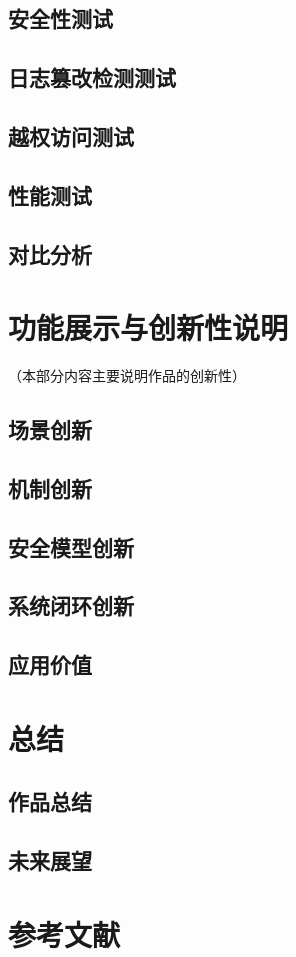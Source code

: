 \documentclass[UTF8,a4paper,zihao=-4,fontset=fandol]{ctexart}
\begin{document}
\subsection{安全性测试}

\subsection{日志篡改检测测试}

\subsection{越权访问测试}

\subsection{性能测试}

\subsection{对比分析}



\newpage
\section{功能展示与创新性说明}
（本部分内容主要说明作品的创新性）
\subsection{场景创新}

\subsection{机制创新}

\subsection{安全模型创新}

\subsection{系统闭环创新}

\subsection{应用价值}


\newpage
\section{总结}
\subsection{作品总结}

\subsection{未来展望}



\newpage
\section*{参考文献}
\end{document}
